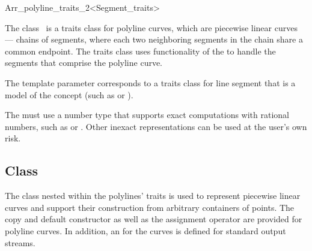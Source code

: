
\ccRefPageBegin

\begin{ccRefClass}{Arr_polyline_traits_2<Segment_traits>}

\ccDefinition
    The class \ccRefName\ is a traits class for polyline curves, which are
    piecewise linear curves --- chains of segments, where each two neighboring
    segments in the chain share a common endpoint. The traits class uses
    functionality of the  to handle the segments that 
    comprise the polyline curve.

    The template parameter  corresponds to a traits class
    for line segment that is a model of the  concept 
    (such as  or 
    ).

    The  must use a number type that supports exact computations
    with rational numbers, such as  or 
    . Other inexact representations can be used at the 
    user's own risk.


\ccIsModel
     

%
\subsection*{Class }

The  class nested within the polylines' traits is used to
represent piecewise linear curves and support their construction from
arbitrary containers of points. The copy and default constructor as well as 
the assignment operator are provided for polyline curves. In addition, 
an  for the curves is defined for standard output streams.


\end{ccRefClass}
